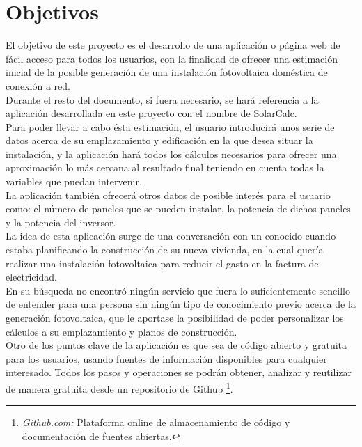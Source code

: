 \section{Objetivos}
El objetivo de este proyecto es el desarrollo de una aplicación o página web de fácil acceso para todos los usuarios, con la finalidad de ofrecer una estimación inicial de la posible generación de una instalación fotovoltaica doméstica de conexión a red.\\

Durante el resto del documento, si fuera necesario, se hará referencia a la aplicación desarrollada en este proyecto con el nombre de SolarCalc.\\

Para poder llevar a cabo ésta estimación, el usuario introducirá unos serie de datos acerca de su emplazamiento y edificación en la que desea situar la instalación, y la aplicación hará todos los cálculos necesarios para ofrecer una aproximación lo más cercana al resultado final teniendo en cuenta todas la variables que puedan intervenir.\\

La aplicación también ofrecerá otros datos de posible interés para el usuario como: el número de paneles que se pueden instalar, la potencia de dichos paneles y la potencia del inversor.\\

La idea de esta aplicación surge de una conversación con un conocido cuando estaba planificando la construcción de su nueva vivienda, en la cual quería realizar una instalación fotovoltaica para reducir el gasto en la factura de electricidad.\\

En su búsqueda no encontró ningún servicio que fuera lo suficientemente sencillo de entender para una persona sin ningún tipo de conocimiento previo acerca de la generación fotovoltaica, que le aportase la posibilidad de poder personalizar los cálculos a su emplazamiento y planos de construcción.\\

Otro de los puntos clave de la aplicación es que sea de código abierto y gratuita para los usuarios, usando fuentes de información disponibles para cualquier interesado. Todos los pasos y operaciones se podrán obtener, analizar y reutilizar de manera gratuita desde un repositorio de Github \footnote{\textit{Github.com:} Plataforma online de almacenamiento de código y documentación de fuentes abiertas.}.\\


